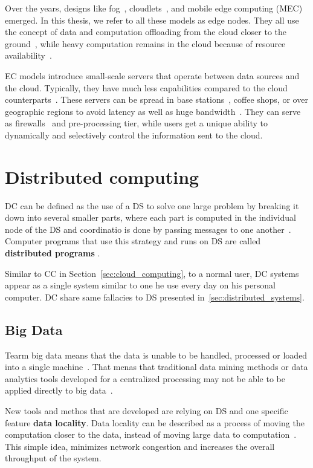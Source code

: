 Over the years, designs like fog~\cite{BonomiMNZ14}, cloudlets~\cite{MonsalveCC18}, and mobile edge computing (MEC)~\cite{WangZZWYW17} emerged. In this thesis, we refer to all these models as edge nodes. They all use the concept of data and computation offloading from the cloud closer to the ground~\cite{KhuneP19}, while heavy computation remains in the cloud because of resource availability~\cite{NingLSY20}. 

EC models introduce small-scale servers that operate between data sources and the cloud. Typically, they have much less capabilities compared to the cloud counterparts~\cite{ChenHLLW15}. These servers can be spread in base stations~\cite{WangZZWYW17}, coffee shops, or over geographic regions to avoid latency as well as huge bandwidth~\cite{MonsalveCC18}. They can serve as firewalls~\cite{SatyanarayananK19} and pre-processing tier, while users get a unique ability to dynamically and selectively control the information sent to the cloud.
%
%
\section{Distributed computing}\label{sec:distributed_computing}
%
DC can be defined as the use of a DS to solve one large problem by breaking it down into several smaller parts, where each part is computed in the individual node of the DS and coordinatio is done by passing messages to one another~\cite{0019513}. Computer programs that use this strategy and runs on DS are called \textbf{distributed programs} \cite{Vera16, andrews2000foundations}. 

Similar to CC in Section~\ref{sec:cloud_computing}, to a normal user, DC systems appear as a single system similar to one he use every day on his personal computer. DC share same fallacies to DS presented in~\ref{sec:distributed_systems}.
%
%
\subsection{Big Data}\label{sec:big_data}
%
Tearm big data means that the data is unable to be handled, processed or loaded into a single machine~\cite{FisherDCD12}. That menas that traditional data mining methods or data analytics tools developed for a centralized processing  may not be able to be applied directly to big data~\cite{Tsai2015}. 

New tools and methos that are developed are relying on DS and one specific feature \textbf{data locality}. Data locality can be described as a process of moving the computation closer to the data, instead of moving large data to computation~\cite{GuoFZ12}. This simple idea, minimizes network congestion and increases the overall throughput of the system.

